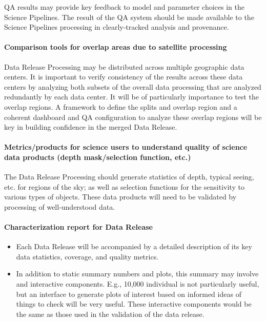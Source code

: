QA results may provide key feedback to model and parameter choices in the Science Pipelines.  The result of the QA system should be made available to the Science Pipelines processing in clearly-tracked analysis and provenance.


\paragraph{Comparison tools for overlap areas due to satellite processing}
\label{sec:qaComparisonSatelliteDataCenters}

Data Release Processing may be distributed across multiple geographic data centers.  It is important to verify consistency of the results across these data centers by analyzing both subsets of the overall data processing that are analyzed redundantly by each data center.  It will be of particularly importance to test the overlap regions.  A framework to define the splits and overlap region and a coherent dashboard and QA configuration to analyze these overlap regions will be key in building confidence in the merged Data Release.

\paragraph{Metrics/products for science users to understand quality of science data products (depth mask/selection function, etc.)}
\label{sec:qaScienceUsersMetrics}

The Data Release Processing should generate statistics of depth, typical seeing, etc. for regions of the sky; as well as selection functions for the sensitivity to various types of objects.  These data products will need to be validated by processing of well-understood data.


\paragraph{Characterization report for Data Release}
\label{sec:qaCharacterizationReportDrp}
\begin{itemize}
\item Each Data Release will be accompanied by a detailed description of its key data statistics, coverage, and quality metrics.
\item In addition to static summary numbers and plots, this summary may involve and interactive components.  E.g., 10,000 individual is not particularly useful, but an interface to generate plots of interest based on informed ideas of things to check will be very useful. These interactive components would be the same as those used in the validation of the data release.
\end{itemize}

